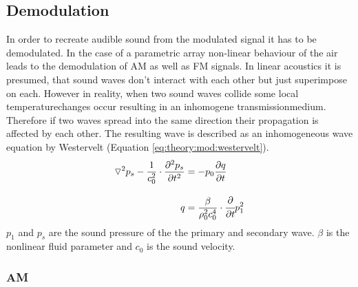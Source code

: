 \subsection{Demodulation}

In order to recreate audible sound from the modulated signal it has to be demodulated. In the case of a parametric array non-linear behaviour of the air leads to the demodulation of AM as well as FM signals.\p
%
In linear acoustics it is presumed, that sound waves don't interact with each other but just superimpose on each. However in reality, when two sound waves collide some local temperaturechanges occur resulting in an inhomogene transmissionmedium. Therefore if two waves spread into the same direction their propagation is affected by each other. The resulting wave is described as an inhomogeneous wave equation by Westervelt (Equation \ref{eq:theory:mod:westervelt}).\cite{westervelt_parametric_1963}\cite{yoneyama_audio_1983}
%
\begin{align}
  \triangledown^2 p_s - \frac{1}{c_0^2} \cdot \frac{\partial^2 p_s}{\partial t^2} & = - p_0 \frac{\partial q}{\partial t}\label{eq:theory:mod:westervelt}\pmath
  q &= \frac{\beta}{\rho_0^2 c_0^4} \cdot \cfrac{\partial }{\partial t} p_1^2 \label{eq:theory:mod:westervelt_q}
\end{align}
%
$p_1$ and $p_s$ are the sound pressure of the the primary and secondary wave. $\beta$ is the nonlinear fluid parameter and $c_0$ is the sound velocity.

\subsubsection*{AM}

